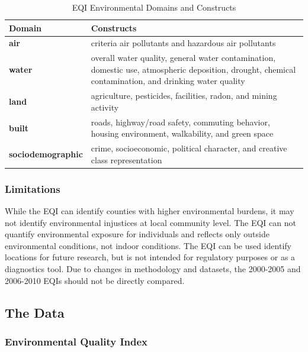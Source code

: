 \documentclass[
]{article}
\begin{document}
\begin{table}

\caption{\label{tab:unnamed-chunk-3}EQI Environmental Domains and Constructs}
\centering
\begin{tabular}[t]{>{}l||l}
\hline
Domain & Constructs\\
\hline
\textbf{air} & criteria air pollutants and hazardous air pollutants\\
\hline
\textbf{water} & overall water quality, general water contamination, domestic use, atmospheric deposition, drought, chemical contamination, and drinking water quality\\
\hline
\textbf{land} & agriculture, pesticides, facilities, radon, and mining activity\\
\hline
\textbf{built} & roads, highway/road safety, commuting behavior, housing environment, walkability, and green space\\
\hline
\textbf{sociodemographic} & crime, socioeconomic, political character, and creative class representation\\
\hline
\end{tabular}
\end{table}

\hypertarget{limitations}{%
\subsubsection{Limitations}\label{limitations}}

While the EQI can identify counties with higher environmental burdens,
it may not identify environmental injustices at local community level.
The EQI can not quantify environmental exposure for individuals and
reflects only outside environmental conditions, not indoor conditions.
The EQI can be used identify locations for future research, but is not
intended for regulatory purposes or as a diagnostics tool. Due to
changes in methodology and datasets, the 2000-2005 and 2006-2010 EQIs
should not be directly compared.

\hypertarget{the-data}{%
\subsection{The Data}\label{the-data}}

\hypertarget{environmental-quality-index}{%
\subsubsection{Environmental Quality
Index}\label{environmental-quality-index}}
\end{document}
